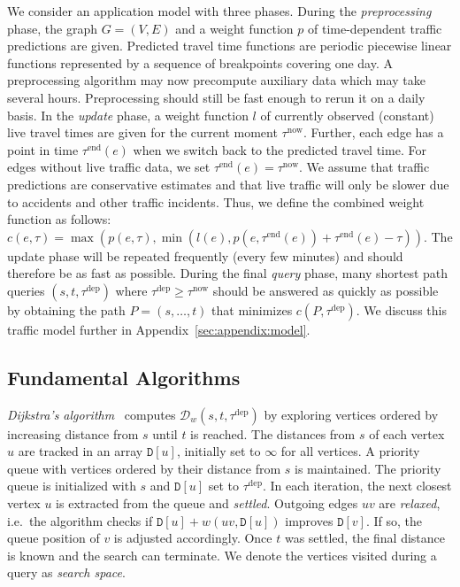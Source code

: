 \documentclass[a4paper,UKenglish,cleveref, autoref, thm-restate,anonymous]{lipics-v2021}
\newcommand*{\pred}{p}
\newcommand*{\comb}{c}
\newcommand*{\dist}{\mathcal{D}}
\newcommand*{\tdep}{\tau^{\operatorname{dep}}}
\begin{document}
We consider an application model with three phases.
During the \emph{preprocessing} phase, the graph $G=(V,E)$ and a weight function $\pred$ of time-dependent traffic predictions are given.
Predicted travel time functions are periodic piecewise linear functions represented by a sequence of breakpoints covering one day.
A preprocessing algorithm may now precompute auxiliary data which may take several hours.
Preprocessing should still be fast enough to rerun it on a daily basis.
In the \emph{update} phase, a weight function $l$ of currently observed (constant) live travel times are given for the current moment $\tau^{\operatorname{now}}$.
Further, each edge has a point in time $\tau^{\operatorname{end}}(e)$ when we switch back to the predicted travel time.
For edges without live traffic data, we set $\tau^{\operatorname{end}}(e) = \tau^{\operatorname{now}}$.
We assume that traffic predictions are conservative estimates and that live traffic will only be slower due to accidents and other traffic incidents.
Thus, we define the combined weight function as follows:
$\comb(e, \tau) = \max(\pred(e, \tau), \min(l(e), \pred(e, \tau^{\operatorname{end}}(e)) + \tau^{\operatorname{end}}(e) - \tau))$.
The update phase will be repeated frequently (every few minutes) and should therefore be as fast as possible.
During the final \emph{query} phase, many shortest path queries $(s,t,\tdep)$ where $\tdep \geq \tau^{\operatorname{now}}$ should be answered as quickly as possible by obtaining the path $P = (s,\dots,t)$ that minimizes $\comb(P, \tdep)$.
We discuss this traffic model further in Appendix~\ref{sec:appendix:model}.

\subsection{Fundamental Algorithms}

\emph{Dijkstra's algorithm}~\cite{d-ntpcg-59} computes $\dist_w(s,t,\tdep)$ by exploring vertices ordered by increasing distance from $s$ until $t$ is reached.
The distances from $s$ of each vertex $u$ are tracked in an array $\mathtt{D}[u]$, initially set to $\infty$ for all vertices.
A priority queue with vertices ordered by their distance from $s$ is maintained.
The priority queue is initialized with $s$ and $\mathtt{D}[u]$ set to $\tdep$.
In each iteration, the next closest vertex $u$ is extracted from the queue and \emph{settled}.
Outgoing edges $uv$ are \emph{relaxed}, i.e.\ the algorithm checks if $\mathtt{D}[u] + w(uv, \mathtt{D}[u])$ improves $\mathtt{D}[v]$.
If so, the queue position of $v$ is adjusted accordingly.
Once $t$ was settled, the final distance is known and the search can terminate.
We denote the vertices visited during a query as \emph{search space}.
\end{document}
